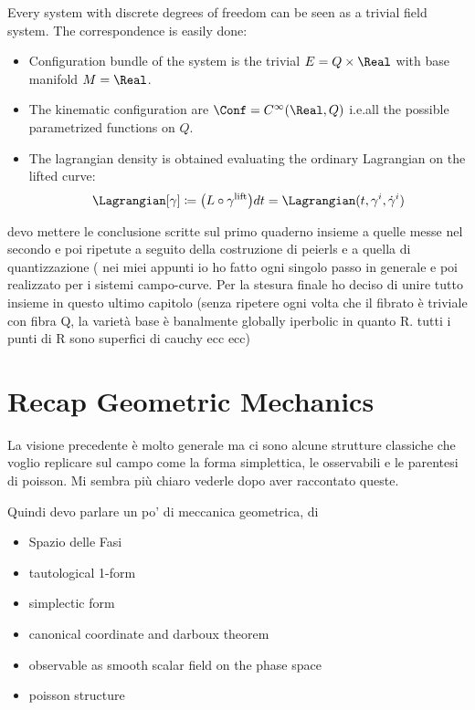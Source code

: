 \documentclass[Main]{subfiles}
\begin{document}
		  	Every system with discrete degrees of freedom can be seen as a trivial field system.
			The correspondence is easily done:
			\begin{itemize}
				\item Configuration bundle of the system is the trivial $E= Q \times \Real$ with base manifold $M=\Real$.
				\item The kinematic configuration are $\Conf=C^\infty(\Real,Q)$ i.e.all the possible parametrized functions on $Q$.
				\item The lagrangian density is obtained evaluating the ordinary Lagrangian on the lifted curve:
					\begin{equation}
						\Lagrangian  [\gamma] \coloneqq \big( L \circ	\gamma^\textrm{lift} \big) dt  = \Lagrangian(t,\gamma^i,\dot{\gamma}^i)
					\end{equation}
	\end{itemize}
	\begin{Warning}
		devo mettere le conclusione scritte sul primo quaderno insieme a quelle messe nel secondo e poi ripetute a seguito della costruzione di peierls e a quella di quantizzazione ( nei miei appunti io ho fatto ogni singolo passo in generale e poi realizzato per i sistemi campo-curve. Per la stesura finale ho deciso di unire tutto insieme in questo ultimo capitolo (senza ripetere ogni volta che il fibrato è triviale con fibra Q, la varietà base è banalmente globally iperbolic in quanto R. tutti i punti di R sono superfici di cauchy ecc ecc)
	\end{Warning}
	
	\section{Recap Geometric Mechanics}
		
	\begin{Warning}	
	 La visione precedente è molto generale ma ci sono alcune strutture classiche che voglio replicare sul campo come la forma simplettica, le osservabili e le parentesi di poisson.
	 Mi sembra più chiaro vederle dopo aver raccontato queste.
	 
	Quindi devo parlare un po' di meccanica geometrica, di
	\begin{itemize}
		\item Spazio delle Fasi
		\item tautological 1-form
		\item simplectic form
		\item canonical coordinate and darboux theorem
		\item observable as smooth scalar field on the phase space
		\item poisson structure
	\end{itemize}
	\end{Warning}
	
\end{document}
